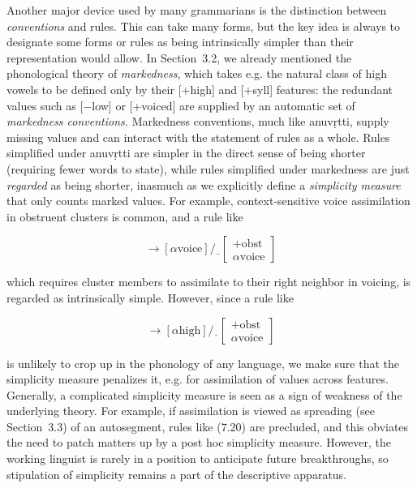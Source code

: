 Another major device used by many grammarians is the distinction between {\it
  conventions} and rules. This can take many forms,  but the
key idea is always to designate some forms or rules as being intrinsically
simpler than their representation would allow. In Section~3.2, we already
mentioned the phonological theory of {\it markedness}, which
takes e.g. the natural class of high vowels to be defined only by their
[+high] and [+syll] features: the redundant values such as [$-$low] or
[+voiced] are supplied by an automatic set of {\it markedness conventions.}
Markedness conventions, much like anuv\d{r}tti, supply missing values and can
interact with the statement of rules as a whole. Rules simplified under
anuv\d{r}tti are simpler in the direct sense of being shorter (requiring fewer
words to state), while rules simplified under markedness are just {\it
  regarded} as being shorter, inasmuch as we explicitly define a {\it
  simplicity measure} that only counts marked values. For example,
context-sensitive voice assimilation in obstruent clusters is
common, and a rule like

\begin{equation}
[+\text{obst}]\rightarrow[\alpha\text{voice}]/\underline{\
  \ }\left[ \begin{array}{c}+\text{obst}\\\alpha\text{voice}\end{array}\right]
\end{equation}

\smallskip\noindent which requires cluster members to assimilate to their
right neighbor in voicing, is regarded as intrinsically simple. However, since
a rule like 

\begin{equation}
[+\text{syll}]\rightarrow[\alpha\text{high}]/\underline{\
  \ }\left[ \begin{array}{c}+\text{obst}\\\alpha\text{voice}\end{array}\right]
\end{equation}

\smallskip\noindent is unlikely to crop up in the phonology of any language,
we make sure that the simplicity measure penalizes it, e.g. for assimilation
of values across features. Generally, a complicated simplicity measure is seen
as a sign of weakness of the underlying theory. For example, if assimilation
is viewed as spreading (see Section~3.3) of an autosegment, rules like (7.20)
are precluded, and this obviates the need to patch matters up by a post hoc
simplicity measure. However, the working linguist is rarely in a position to
anticipate future breakthroughs, so stipulation of simplicity remains a part
of the descriptive apparatus.

